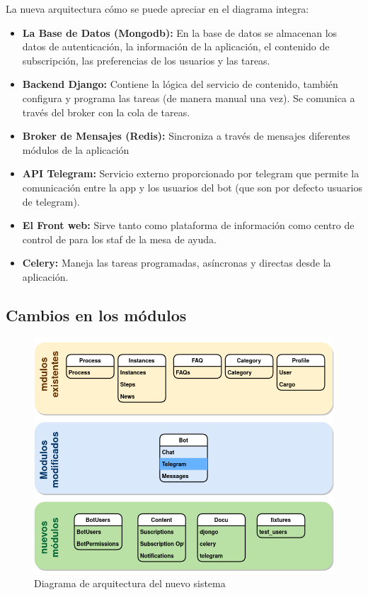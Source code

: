     \par La nueva arquitectura cómo se puede apreciar en el diagrama integra:
    \begin{itemize}
        \item \textbf{La Base de Datos (Mongodb):}  En la base de datos se almacenan los datos de autenticación, la información de la aplicación, el contenido de subscripción, las preferencias de los usuarios y las tareas.
        \item  \textbf{Backend Django:} Contiene la lógica del servicio de contenido, también configura y programa las tareas (de manera manual una vez). Se comunica a través del broker con la cola de tareas.
        \item \textbf{Broker de Mensajes (Redis):} Sincroniza a través de mensajes diferentes módulos de la aplicación
        \item  \textbf{API Telegram:} Servicio externo proporcionado por telegram que permite la comunicación entre la app y los usuarios del bot (que son por defecto usuarios de telegram).
        \item  \textbf{El Front web:} Sirve tanto como plataforma de información como centro de control de para los staf de la mesa de ayuda.
        \item \textbf{Celery:} Maneja las tareas programadas, asíncronas y directas desde la aplicación.
    \end{itemize}
    
    \subsection{Cambios en los módulos}

    \begin{figure}[h!]
        \centering
        \includegraphics[width=\textwidth]{media/diagramas/arquitectura/arc-logica.png}
        \caption[Nueva arquitectura]{Diagrama de arquitectura del nuevo sistema}
        
    \end{figure}
  

